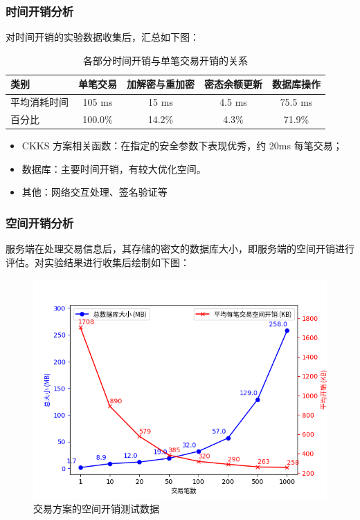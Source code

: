 \begin{frame}
    \frametitle{时间开销分析}

    对时间开销的实验数据收集后，汇总如下图：

    \begin{table}[h]
        \begin{tabular}{|l|c|c|c|c|}
            \hline
            类别 & 单笔交易 & 加解密与重加密 & 密态余额更新 & 数据库操作 \\
            \hline
            平均消耗时间 & 105 ms & 15 ms & 4.5 ms & 75.5 ms \\ 
            \hline
            百分比 & 100.0\% & 14.2\% & 4.3\% & 71.9\% \\
            \hline
        \end{tabular}
        \caption{各部分时间开销与单笔交易开销的关系}
    \end{table}

    \begin{itemize}
        \item CKKS 方案相关函数：在指定的安全参数下表现优秀，约 20ms 每笔交易；
        \item 数据库：主要时间开销，有较大优化空间。
        \item 其他：网络交互处理、签名验证等
    \end{itemize}


\end{frame}

\begin{frame}
    \frametitle{空间开销分析}

    服务端在处理交易信息后，其存储的密文的数据库大小，即服务端的空间开销进行评估。对实验结果进行收集后绘制如下图：

    \begin{figure}[h]
        \centering
        \includegraphics[width=0.8\linewidth]{./figures/Bench_DatabaseSize.png}
        \caption{交易方案的空间开销测试数据}
    \end{figure}

\end{frame}



